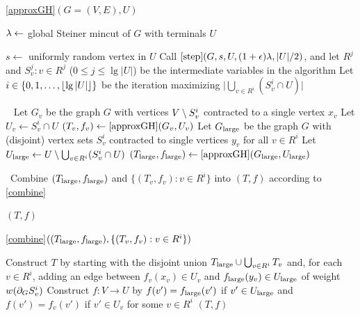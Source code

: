 \begin{algorithm}[H]
\caption{\ref{approxGH}$(G=(V,E),U)$} 
\begin{algorithmic}[1]
\State $\lambda\gets $ global Steiner mincut of $G$ with terminals $U$ %

\State $s\gets$ uniformly random vertex in $U$
\State Call $\ref{step}(G,s,U,(1+\epsilon)\lambda,|U|/2)$, and let $R^j$ and $S^j_v:v\in R^j$ ($0\le j\le\lg|U|$) be the intermediate variables in the algorithm
\State Let $i\in\{0,1,\ldots,\lfloor\lg|U|\rfloor\}$ be the iteration maximizing $\big|\bigcup_{v\in R^i} (S^i_v\cap U)\big|$ 

\ 
 
 \State Let $G_v$ be the graph $G$ with vertices $V\setminus S^i_v$ contracted to a single vertex $x_v$ 
 \State Let $U_v\gets S^i_v\cap U$
 \State $(T_v,f_v)\gets\ref{approxGH}(G_v,U_v)$
\EndFor
\State Let $G_{\textup{large}}$ be the graph $G$ with (disjoint) vertex sets $S^i_v$ contracted to single vertices $y_v$ for all $v\in R^i$
\State Let $U_{\textup{large}}\gets U\setminus\bigcup_{v\in R^i}(S^i_v\cap U)$
\State $(T_{\textup{large}},f_{\textup{large}})\gets\ref{approxGH}(G_{\textup{large}},U_{\textup{large}})$

\
\State Combine $(T_{\textup{large}},f_{\textup{large}})$ and $\{(T_v,f_v):v\in R^i\}$ into $(T,f)$ according to \ref{combine}%

\State\Return $(T,f)$

\end{algorithmic}
\end{algorithm}


\begin{algorithm}[H]
\caption{\ref{combine}$((T_{\textup{large}},f_{\textup{large}}),\{(T_v,f_v): v\in R^i\} )$} 
\begin{algorithmic}[1]
\State Construct $T$ by starting with the disjoint union $T_{\textup{large}}\cup\bigcup_{v\in R^i}T_v$ and, for each $v\in R^i$, adding an edge between $f_v(x_v)\in U_v$ and $f_{\textup{large}}(y_v)\in U_{\textup{large}}$ of weight $w(\partial_GS^i_v)$
\State Construct $f:V\to U$ by $f(v')=f_{\textup{large}}(v')$ if $v'\in U_{\textup{large}}$ and $f(v')=f_v(v')$ if $v'\in U_v$ for some $v\in R^i$\linel{combine-f}
\State\Return $(T,f)$
\end{algorithmic}
\end{algorithm}

